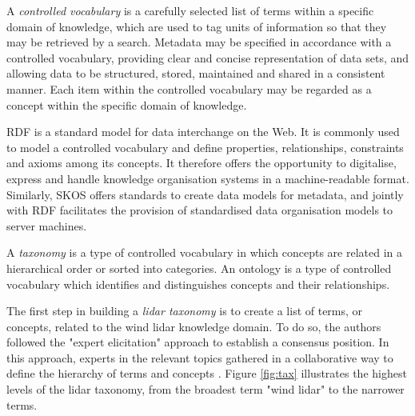 \documentclass[remotesensing,article,submit,pdftex,moreauthors]{Definitions/mdpi}
\begin{document}
A {\it controlled vocabulary} is a carefully selected list of terms within a specific domain of knowledge, which are used to tag units of information so that they may be retrieved by a search.
Metadata may be specified in accordance with a controlled vocabulary, providing clear and concise representation of data sets, and allowing data to be structured, stored, maintained and shared in a consistent manner. Each item within the controlled vocabulary may be regarded as a concept within the specific domain of knowledge.

RDF is a standard model for data interchange on the Web. It is commonly used to model a controlled vocabulary and define properties, relationships, constraints and axioms among its concepts. It therefore offers the opportunity to digitalise, express and handle knowledge organisation systems in a machine-readable format. Similarly, SKOS offers standards to create data models for metadata, and jointly with RDF facilitates the provision of standardised data organisation models to server machines.

A {\it taxonomy} is a type of controlled vocabulary in which concepts are related in a hierarchical order or sorted into categories. An ontology is a type of controlled vocabulary which identifies and distinguishes concepts and their relationships.

The first step in building a {\it lidar taxonomy} is to create a list of terms, or concepts, related to the wind lidar knowledge domain. To do so, the authors followed the "expert elicitation" approach to establish a consensus position. In this approach, experts in the relevant topics gathered in a collaborative way to define the hierarchy of terms and concepts \cite{ref-IRPWind}. Figure \ref{fig:tax} illustrates the highest levels of the lidar taxonomy, from the broadest term "wind lidar" to the narrower terms.
\end{document}
